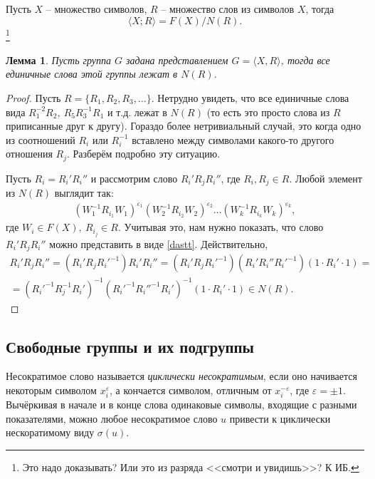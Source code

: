 \documentclass{article}
\newtheorem{lemma}{Лемма}[section]
\begin{document}
Пусть $X$ -- множество символов, $R$ -- множество слов из символов $X$, тогда $$ \langle X; R \rangle = F(X) / N(R). $$ \footnote{Это надо доказывать? Или это из разряда <<смотри и увидишь>>? К ИБ.} 

\begin{lemma}
    Пусть группа $G$ задана представлением $G = \langle X, R \rangle$, тогда все единичные слова этой группы лежат в $N(R)$.
\end{lemma}
\begin{proof}
    Пусть $R = \{ R_1, R_2, R_3, \ldots \}$. Нетрудно увидеть, что все единичные слова вида $R_1^{-2} R_2, \ R_5 R_3^{-1} R_1$ и т.д. лежат в $N(R)$ (то есть это просто слова из $R$ приписанные друг к другу). Гораздо более нетривиальный случай, это когда одно из соотношений $R_i$ или $R_i^{-1}$ вставлено между символами какого-то другого отношения $R_j$. Разберём подробно эту ситуацию.

    Пусть $R_i = R_i' R_i''$ и рассмотрим слово $R_i' R_j R_i''$, где $R_i, R_j \in R$. Любой элемент из $N(R)$ выглядит так:
    \begin{gather} \tag{*} \label{dastt}
        (W_1^{-1} R_{i_1} W_1)^{\varepsilon_1} (W_2^{-1} R_{i_2} W_2)^{\varepsilon_2} \ldots (W_k^{-1} R_{i_k} W_k)^{\varepsilon_k},
    \end{gather}
    где $ W_i \in F(X), \ R_{i_j} \in R. $
    Учитывая это, нам нужно показать, что слово $R_i' R_j R_i''$ можно представить в виде \eqref{dastt}. Действительно,
    \begin{gather*}
        R_i' R_j R_i'' =  (R_i' R_j R_i'^{-1}) R_i' R_i'' = (R_i' R_j R_i'^{-1}) (R_i' R_i'' R_i'^{-1}) ( 1 \cdot R_i' \cdot 1) = \\
        = (R_i'^{-1} R_j^{-1} R_i')^{-1} (R_i'^{-1} R_i''^{-1} R_i')^{-1} ( 1 \cdot R_i' \cdot 1) \in N(R).
    \end{gather*}
\end{proof}

\subsection{Свободные группы и их подгруппы}

Несократимое слово называется \textit{циклически несократимым}, если оно начивается некоторым символом $x_i^{\varepsilon}$, а кончается символом, отличным от $x_i^{-\varepsilon}$, где $\varepsilon = \pm 1$. Вычёркивая в начале и в конце слова одинаковые символы, входящие с разными показателями, можно любое несократимое слово $u$ привести к циклически нескоратимому виду $\sigma(u)$.
\end{document}
